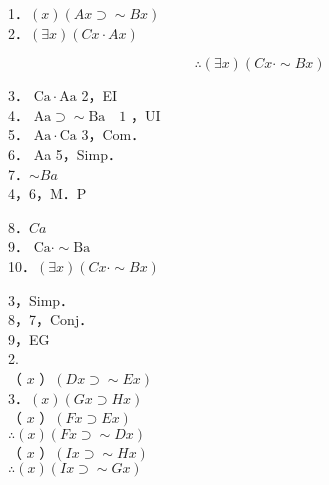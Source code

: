 1．$(x)(A x \supset \sim B x)$\\
2．$(\exists x)(C x \cdot A x)$

$$
\therefore(\exists x)(C x \cdot \sim B x)
$$

3． $\mathrm{Ca} \cdot \mathrm{Aa}$ 2，EI\\
4． $\mathrm{Aa} \supset \sim \mathrm{Ba} \quad 1$ ，UI\\
5． $\mathrm{Aa} \cdot \mathrm{Ca}$ 3，Com．\\
6． Aa 5，Simp．\\
7．$\sim B a$\\
4，6，M．P

8．$C a$\\
9． $\mathrm{Ca} \cdot \sim \mathrm{Ba}$\\
10．$(\exists x)(C x \cdot \sim B x)$

3，Simp．\\
8，7，Conj．\\
9，EG\\
2.\\
（ $x$ ）$(D x \supset \sim E x)$\\
3．$(x)(G x \supset H x)$\\
（ $x$ ）$(F x \supset E x)$\\
$\therefore(x)(F x \supset \sim D x)$\\
（ $x$ ）$(I x \supset \sim H x)$\\
$\therefore(x)(I x \supset \sim G x)$

